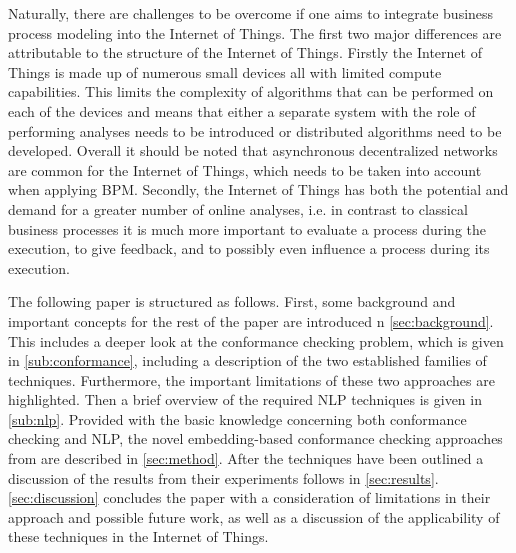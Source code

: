 \documentclass[runningheads]{template/llncs}
\begin{document}
Naturally, there are challenges to be overcome if one aims to integrate business process modeling into the Internet of Things.
The first two major differences are attributable to the structure of the Internet of Things.
Firstly the Internet of Things is made up of numerous small devices all with limited compute capabilities.
This limits the complexity of algorithms that can be performed on each of the devices and means that either a separate system with the role of performing analyses needs to be introduced or distributed algorithms need to be developed.
Overall it should be noted that asynchronous decentralized networks are common for the Internet of Things, which needs to be taken into account when applying BPM.
Secondly, the Internet of Things has both the potential and demand for a greater number of online analyses, i.e. in contrast to classical business processes it is much more important to evaluate a process during the execution, to give feedback, and to possibly even influence a process during its execution.

\color{red}
The following paper is structured as follows.
First, some background and important concepts for the rest of the paper are introduced n \cref{sec:background}.
This includes a deeper look at the conformance checking problem, which is given in \cref{sub:conformance}, including a description of the two established families of techniques.
Furthermore, the important limitations of these two approaches are highlighted.
Then a brief overview of the required NLP techniques is given in \cref{sub:nlp}.
Provided with the basic knowledge concerning both conformance checking and NLP, the novel embedding-based conformance checking approaches from \cite{PBWe20} are described in \cref{sec:method}.
After the techniques have been outlined a discussion of the results from their experiments follows in \cref{sec:results}.
\cref{sec:discussion} concludes the paper with a consideration of limitations in their approach and possible future work, as well as a discussion of the applicability of these techniques in the Internet of Things.
\color{black}
\end{document}
